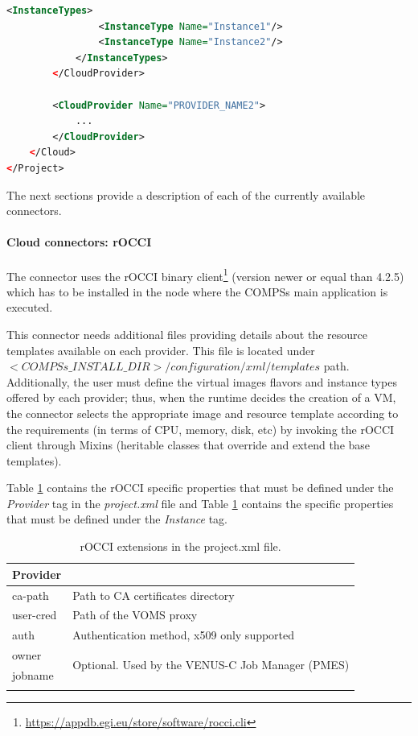 \begin{lstlisting}[language=xml]
            <InstanceTypes>
                <InstanceType Name="Instance1"/>
                <InstanceType Name="Instance2"/>
            </InstanceTypes>
        </CloudProvider>
        
        <CloudProvider Name="PROVIDER_NAME2">
            ...
        </CloudProvider>
    </Cloud>
</Project>
\end{lstlisting}

The next sections provide a description of each of the currently available connectors.

\paragraph{Cloud connectors: rOCCI}
The connector uses the rOCCI binary client\footnote{\url{https://appdb.egi.eu/store/software/rocci.cli}} 
(version newer or equal than 4.2.5) which has to be installed in the node where the COMPSs main 
application is executed.

This connector needs additional files providing details about the resource templates available on 
each provider. This file is located under $<COMPSs\_INSTALL\_DIR>/configuration/xml/templates$ path.
Additionally, the user must define the virtual images flavors and instance types offered by each provider; 
thus, when the runtime decides the creation of a VM, the connector selects the appropriate image and 
resource template according to the requirements (in terms of CPU, memory, disk, etc) by invoking the 
rOCCI client through Mixins (heritable classes that override and extend the base templates).

Table \ref{tab:rOCCI_extensions} contains the rOCCI specific properties that must be defined under the \textit{Provider} tag in
the \textit{project.xml} file and Table \ref{tab:rOCCI_extensions} contains the specific properties that must be defined
under the \textit{Instance} tag.

\bgroup
  \def\arraystretch{1.5}
  \begin{longtable}{| p{} | p{} |}
      \hline
      \textbf{Provider}    & \\ \hline
      ca-path              & Path to CA certificates directory \\ \hline
      user-cred            & Path of the VOMS proxy \\ \hline
      auth                 & Authentication method, x509 only supported \\ \hline
      owner                & \multirow{2}{*}{Optional. Used by the VENUS-C Job Manager (PMES)} \\
                             \cline{1-1}
      jobname              & \\ \hline
      \caption{rOCCI extensions in the project.xml file.}
      \label{tab:rOCCI_extensions}
  \end{longtable}
\egroup

